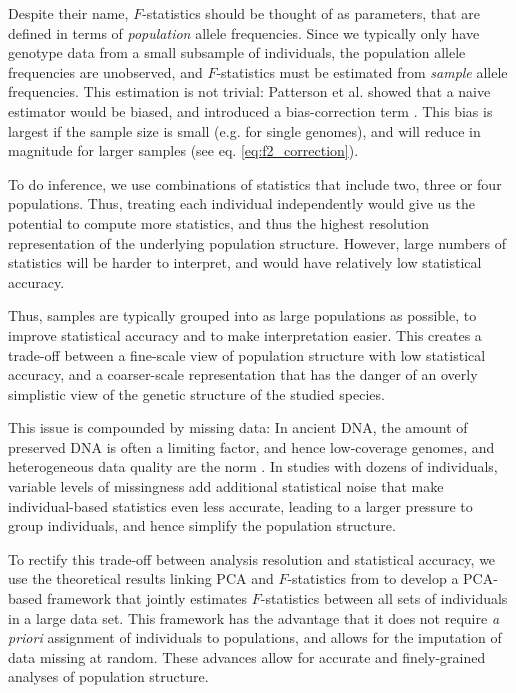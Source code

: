 \documentclass[12pt]{article}
\begin{document}
Despite their name, $F$-statistics should be thought of as parameters, that are defined in terms of \textit{population} allele frequencies. Since we typically only have genotype data from a small subsample of individuals, the population allele frequencies are unobserved, and $F$-statistics must be estimated from \textit{sample} allele frequencies. This estimation is not trivial: Patterson et al. showed that a naive estimator would be biased, and introduced a bias-correction term \citep{patterson_ancient_2012}. This bias is largest if the sample size is small (e.g. for single genomes), and will reduce in magnitude for larger samples (see eq. \ref{eq:f2_correction}). 

To do inference, we use combinations of statistics that include two, three or four populations. Thus, treating each individual independently would give us the potential to compute more statistics, and thus the highest resolution representation of the underlying population structure. However, large numbers of statistics will be harder to interpret, and would have relatively low statistical accuracy. 

Thus, samples are typically grouped into as large populations as possible, to improve statistical accuracy and to make interpretation easier. This creates a trade-off between a fine-scale view of population structure with low statistical accuracy, and a coarser-scale representation that has the danger of an overly simplistic view of the genetic structure of the studied species.


This issue is compounded by missing data: In ancient DNA, the amount of preserved DNA is often a limiting factor, and hence low-coverage genomes, and heterogeneous data quality are the norm \citep{orlando_ancient_2021}. In studies with dozens of individuals, variable levels of missingness add additional statistical noise that make individual-based statistics even less accurate, leading to a larger pressure to group individuals, and hence simplify the population structure. 

To rectify this trade-off between analysis resolution and statistical accuracy, we use the theoretical results linking PCA and $F$-statistics from \cite{peter_geometric_2022} to develop a PCA-based framework that jointly estimates $F$-statistics between all sets of individuals in a large data set. This framework has the advantage that it does not require \textit{a priori} assignment of individuals to populations, and allows for the imputation of data missing at random. These advances allow for accurate and finely-grained analyses of population structure.
\end{document}
